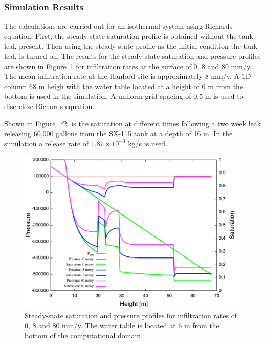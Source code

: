 \documentclass[12pt]{article}
\begin{document}
\subsubsection{Simulation Results}

The calculations are carried out for an isothermal system using Richards equation. First, the steady-state saturation profile is obtained without the tank leak present. Then using the steady-state profile as the initial condition the tank leak is turned on. The results for the steady-state saturation and pressure profiles are shown in Figure~\ref{f1} for infiltration rates at the surface of 0, 8 and 80 mm/y. The mean infiltration rate at the Hanford site is approximately 8 mm/y. A 1D column 68 m heigh with the water table located at a height of 6 m from the bottom is used in the simulation. A uniform grid spacing of 0.5 m is used to discretize Richards equation.

Shown in Figure~\ref{f2} is the saturation at different times following a two week leak releasing 60,000 gallons from the SX-115 tank at a depth of 16 m. In the simulation a release rate of $1.87\!\times\! 10^{-3}$ kg/s is used.


\clearpage

\begin{figure}[h]\centering
\includegraphics[scale=0.45]{./figs/ps}
\caption{Steady-state saturation and pressure profiles for infiltration rates of 0, 8 and 80 mm/y. The water table is located at 6 m from the bottom of the computational domain.}\label{f1}
\end{figure}
\end{document}

